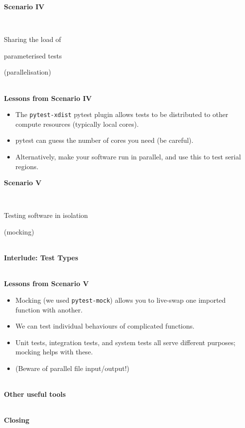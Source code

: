 \documentclass[12pt]{article}
\newlength{\geometrytop}
\newcommand{\slidetitle}[1]{~\\[-0.5ex]{\Large\bf{\color{bold}#1}}\\}
\begin{document}
\thispagestyle{plain}
\vspace*{-\topskip}
\vspace*{\fill}
{\Huge\centerline{\textbf{Scenario IV}}~\newline
\centerline{Sharing the load of}
\centerline{parameterised tests}
\centerline{(parallelisation)}}
\vspace*{\fill}
\vspace*{\geometrytop}
\clearpage

\slidetitle{Lessons from Scenario IV}
\begin{itemize}
\item The \verb|pytest-xdist| pytest plugin allows tests to be distributed to
    other compute resources (typically local cores).
\item pytest can guess the number of cores you need (be careful).
\item Alternatively, make your software run in parallel, and use this to test
    serial regions.
\end{itemize}
\clearpage

\thispagestyle{plain}
\vspace*{-\topskip}
\vspace*{\fill}
{\Huge\centerline{\textbf{Scenario V}}~\newline
\centerline{Testing software in isolation}
\centerline{(mocking)}}
\vspace*{\fill}
\vspace*{\geometrytop}
\clearpage

\slidetitle{Interlude: Test Types}
\clearpage

\slidetitle{Lessons from Scenario V}
\begin{itemize}
\item Mocking (we used \verb|pytest-mock|) allows you to live-swap one imported
    function with another.
\item We can test individual behaviours of complicated functions.
\item Unit tests, integration tests, and system tests all serve different
    purposes; mocking helps with these.
\item (Beware of parallel file input/output!)
\end{itemize}
\clearpage

\slidetitle{Other useful tools}
\clearpage

\slidetitle{Closing}
\clearpage
\end{document}
